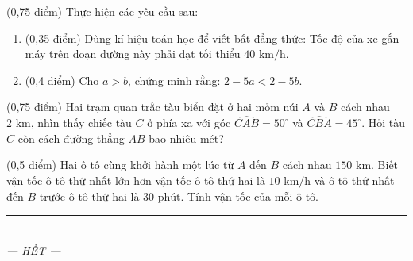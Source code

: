 \documentclass[12pt,a4paper]{article}
\begin{document}
\begin{ex} (0,75 điểm)
Thực hiện các yêu cầu sau:
\begin{enumerate}[label=\textbf{\alph*)}, leftmargin=0.8cm, itemsep=2pt]
\item (0,35 điểm) Dùng kí hiệu toán học để viết bất đẳng thức: Tốc độ của xe gắn máy trên đoạn đường này phải đạt tối thiểu $40\text{ km/h}$.
\item (0,4 điểm) Cho $a > b$, chứng minh rằng: $2 - 5a < 2 - 5b$.
\end{enumerate}
\end{ex}
\vspace{0.5mm}

\begin{ex} (0,75 điểm)
Hai trạm quan trắc tàu biển đặt ở hai mỏm núi $A$ và $B$ cách nhau $2\text{ km}$, nhìn thấy chiếc tàu $C$ ở phía xa với góc $\widehat{CAB} = 50^\circ$ và $\widehat{CBA} = 45^\circ$. Hỏi tàu $C$ còn cách đường thẳng $AB$ bao nhiêu mét?
\begin{center}
\end{center}
\end{ex}
\vspace{0.5mm}

\begin{ex} (0,5 điểm)
Hai ô tô cùng khởi hành một lúc từ $A$ đến $B$ cách nhau $150\text{ km}$. Biết vận tốc ô tô thứ nhất lớn hơn vận tốc ô tô thứ hai là $10\text{ km/h}$ và ô tô thứ nhất đến $B$ trước ô tô thứ hai là $30\text{ phút}$. Tính vận tốc của mỗi ô tô.
\end{ex}
\vspace{0.5mm}


\enlargethispage{1.5cm}
\begin{center}
\rule{4cm}{0.4pt}\\
\textit{--- HẾT ---}
\end{center}
\end{document}
